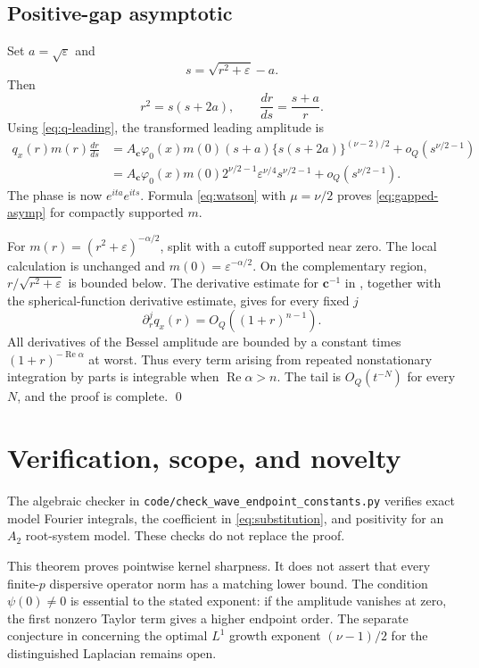 \documentclass[11pt]{article}
\newcommand{\cHC}{\mathbf c}
\begin{document}
\subsection{Positive-gap asymptotic}

Set $a=\sqrt\varepsilon$ and
\[
       s=\sqrt{r^2+\varepsilon}-a.
\]
Then
\begin{equation}\label{eq:substitution}
 r^2=s(s+2a),\qquad \frac{dr}{ds}=\frac{s+a}{r}.
\end{equation}
Using \eqref{eq:q-leading}, the transformed leading amplitude is
\begin{align*}
 q_x(r)m(r)\frac{dr}{ds}
 &=A_{\cHC}\varphi_0(x)m(0)
 (s+a)\{s(s+2a)\}^{(\nu-2)/2}+o_Q(s^{\nu/2-1})\\
 &=A_{\cHC}\varphi_0(x)m(0)
 2^{\nu/2-1}\varepsilon^{\nu/4}s^{\nu/2-1}
 +o_Q(s^{\nu/2-1}).
\end{align*}
The phase is now $e^{ita}e^{its}$.  Formula \eqref{eq:watson} with
$\mu=\nu/2$ proves \eqref{eq:gapped-asymp} for compactly supported $m$.

For $m(r)=(r^2+\varepsilon)^{-\alpha/2}$, split with a cutoff supported near
zero.  The local calculation is unchanged and $m(0)=\varepsilon^{-\alpha/2}$.
On the complementary region, $r/\sqrt{r^2+\varepsilon}$ is bounded below.
The derivative estimate for $\cHC^{-1}$ in \cite[Theorem~2.4]{KS}, together
with the spherical-function derivative estimate, gives for every fixed $j$
\[
      \partial_r^jq_x(r)=O_Q((1+r)^{n-1}).
\]
All derivatives of the Bessel amplitude are bounded by a constant times
$(1+r)^{-\operatorname{Re}\alpha}$ at worst.  Thus every term arising from
repeated nonstationary integration by parts is integrable when
$\operatorname{Re}\alpha>n$.  The tail is $O_Q(t^{-N})$ for every $N$, and
the proof is complete. \qed

\section{Verification, scope, and novelty}

The algebraic checker in
\texttt{code/check\_wave\_endpoint\_constants.py} verifies exact model
Fourier integrals, the coefficient in \eqref{eq:substitution}, and positivity
for an $A_2$ root-system model.  These checks do not replace the proof.

This theorem proves pointwise kernel sharpness.  It does not assert that every
finite-$p$ dispersive operator norm has a matching lower bound.  The condition
$\psi(0)\ne0$ is essential to the stated exponent: if the amplitude vanishes
at zero, the first nonzero Taylor term gives a higher endpoint order.  The
separate conjecture in \cite{KS} concerning the optimal $L^1$ growth exponent
$(\nu-1)/2$ for the distinguished Laplacian remains open.
\end{document}
